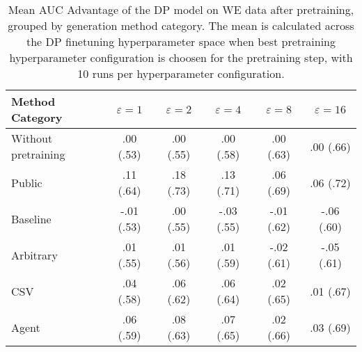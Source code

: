 \begin{table}[h!]
    \centering
    \caption{Mean AUC Advantage of the DP model on WE data after pretraining, grouped by generation method category. The mean is calculated across the DP finetuning hyperparameter space when best pretraining hyperparameter configuration is choosen for the pretraining step, with 10 runs per hyperparameter configuration.}
    \label{tab:epsilon_comparison}
    \begin{tabular}{lccccc}
    \toprule
    Method Category & $\varepsilon=1$ & $\varepsilon=2$ & $\varepsilon=4$ & $\varepsilon=8$ & $\varepsilon=16$ \\
    \midrule
    Without pretraining & .00 {\small (.53)} & .00 {\small (.55)} & .00 {\small (.58)} & .00 {\small (.63)} & .00 {\small (.66)} \\
    \arrayrulecolor{black!50!}\midrule
    Public & \cellcolor{gold!30}.11 {\small (.64)} & \cellcolor{gold!30}.18 {\small (.73)} & \cellcolor{gold!30}.13 {\small (.71)} & \cellcolor{gold!30}.06 {\small (.69)} & \cellcolor{gold!30}.06 {\small (.72)} \\
    \arrayrulecolor{black!50!}\midrule
    Baseline & -.01 {\small (.53)} & .00 {\small (.55)} & -.03 {\small (.55)} & -.01 {\small (.62)} & -.06 {\small (.60)} \\
    \arrayrulecolor{black!50!}\midrule
    Arbitrary & .01 {\small (.55)} & .01 {\small (.56)} & .01 {\small (.59)} & -.02 {\small (.61)} & -.05 {\small (.61)} \\
    \arrayrulecolor{black!50!}\midrule
    CSV & \cellcolor{bronze!30}.04 {\small (.58)} & \cellcolor{bronze!30}.06 {\small (.62)} & \cellcolor{bronze!30}.06 {\small (.64)} & \cellcolor{bronze!30}.02 {\small (.65)} & \cellcolor{bronze!30}.01 {\small (.67)} \\
    Agent & \cellcolor{silver!30}.06 {\small (.59)} & \cellcolor{silver!30}.08 {\small (.63)} & \cellcolor{silver!30}.07 {\small (.65)} & \cellcolor{silver!30}.02 {\small (.66)} & \cellcolor{silver!30}.03 {\small (.69)} \\
    \bottomrule
    \end{tabular}
\end{table}
